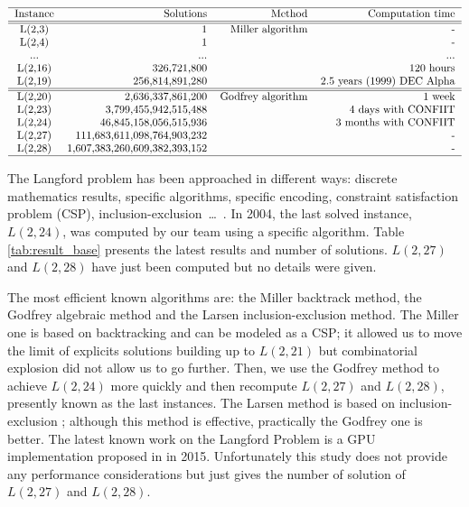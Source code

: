\begin{table}[t!]
\centering
\[
\begin{tabular}{c r r r}
  \hline
  Instance & Solutions & Method & Computation time\\
  \hline
  \hline
  L(2,3) & 1 &  Miller algorithm & - \\
  L(2,4) & 1 & & - \\ 
  ... & ... & & ...  \\
  L(2,16) & 326,721,800 & & 120 hours  \\
  L(2,19) & 256,814,891,280 & & 2.5 years (1999) DEC Alpha \\
  \hline
  \hline
  L(2,20) & 2,636,337,861,200 & Godfrey algorithm & 1 week \\
  L(2,23) & 3,799,455,942,515,488 & &  4 days with CONFIIT \\
  L(2,24) & 46,845,158,056,515,936 & & 3 months with CONFIIT \\
  L(2,27) & 111,683,611,098,764,903,232 & & - \\
  L(2,28) & 1,607,383,260,609,382,393,152 & & - \\
  \hline
\end{tabular}
\]
\caption{Solutions and time for Langford problem using different methods}
\label{tab:result_base}
\end{table}

The Langford problem has been approached in different ways: discrete mathematics results, specific algorithms, specific encoding, constraint satisfaction problem (CSP), inclusion-exclusion~\ldots~\cite{Mil00,apes-26,Smi00,larsen2009counting}.
In 2004, the last solved instance, $L(2,24)$, was computed by our team \cite{CReSTIC-711} using a specific algorithm. 
Table \ref{tab:result_base} presents the latest results and number of solutions. 
$L(2,27)$ and $L(2,28)$ have just been computed but no details were given. 

The most efficient known algorithms are: the Miller backtrack method, the Godfrey algebraic method and the Larsen inclusion-exclusion method.
The Miller one is based on backtracking and can be modeled as a CSP; it allowed us to move the limit of explicits solutions building up to $L(2,21)$ but combinatorial explosion did not allow us to go further. 
Then, we use the Godfrey method to achieve $L(2,24)$ more quickly and then recompute $L(2,27)$ and $L(2,28)$, presently known as the last instances.
The Larsen method is based on inclusion-exclusion \cite{larsen2009counting}; although this method is effective, practically the Godfrey one is better. 
The latest known work on the Langford Problem is a GPU implementation proposed in \cite{ASS_LGF} in 2015. Unfortunately this study does not provide any performance considerations but just gives the number of solution of $L(2,27)$ and $L(2,28)$.

